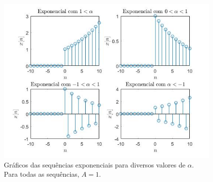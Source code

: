 \documentclass[a4paper, 12pt]{article}
\begin{document}
\begin{figure}[H]
	\centering
	\includegraphics[scale=0.7]{img2.jpg} 
	\caption{Gráficos das sequências exponenciais para diversos valores de $\alpha$. Para todas as sequências, $A=1$.}
	\label{fig:1a}
\end{figure}
\end{document}
